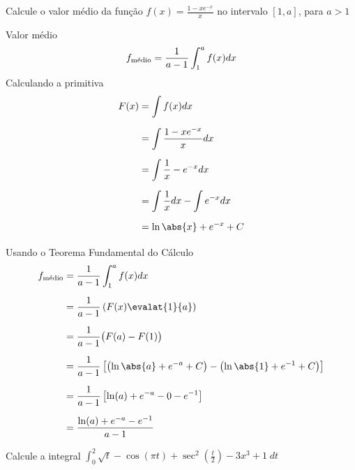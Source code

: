 \documentclass[a4paper,12pt,fleqn]{article}
\begin{document}

Calcule o valor médio da função
\(
  f(x) = \frac{1 -xe^{-x}}{x}
\)
no intervalo \([1, a]\), para $a>1$

\begin{answer}
  Valor médio
  \[
    \fmedio = \frac{1}{a-1}\int_1^a f(x) dx
  \]
  Calculando a primitiva
  \begin{align*}
    F(x) & = \int f(x) dx \\[2mm]
         & = \int \frac{1 -xe^{-x}}{x} dx \\[2mm]
         & = \int \frac{1}{x} -e^{-x} dx \\[2mm]
         & = \int \frac{1}{x} dx - \int e^{-x} dx \\[2mm]
         & = \ln\abs{x} + e^{-x} + C \\[2mm]
  \end{align*}
  Usando o Teorema Fundamental do Cálculo
  \begin{align*}
    \fmedio & = \frac{1}{a-1}\int_1^a f(x) dx \\[2mm]
            & = \frac{1}{a-1}\left(F(x)\evalat{1}{a}\right) \\[2mm]
            & = \frac{1}{a-1}\big(F(a)-F(1)\big) \\[2mm]
            & = \frac{1}{a-1}\left[
                  \left(\ln\abs{a} + e^{-a} + C\right)
                 -\left(\ln\abs{1} + e^{-1} + C\right)
                \right] \\[2mm]
            & = \frac{1}{a-1}\left[ \ln(a) + e^{-a} -0 - e^{-1} \right] \\[2mm]
            & = \frac{\ln(a) + e^{-a} -e^{-1}}{a-1}
  \end{align*}
\end{answer}

Calcule a integral
\(
  \int_0^2 \sqrt{t} - \cos(\pi t) + \sec^2\left(\frac{t}{2}\right) - 3x^3 + 1\; dt
\)
\end{document}
